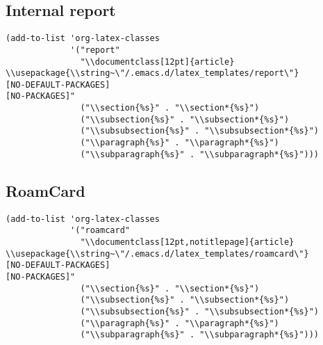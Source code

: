 \documentclass[12pt]{article}
\begin{document}
\subsection{Internal report}
\label{sec:org9e49dab}
\begin{verbatim}
(add-to-list 'org-latex-classes
             '("report"
               "\\documentclass[12pt]{article}
\\usepackage{\\string~\"/.emacs.d/latex_templates/report\"}
[NO-DEFAULT-PACKAGES]
[NO-PACKAGES]"
               ("\\section{%s}" . "\\section*{%s}")
               ("\\subsection{%s}" . "\\subsection*{%s}")
               ("\\subsubsection{%s}" . "\\subsubsection*{%s}")
               ("\\paragraph{%s}" . "\\paragraph*{%s}")
               ("\\subparagraph{%s}" . "\\subparagraph*{%s}")))
\end{verbatim}
\subsection{RoamCard}
\label{sec:org49dca5b}
\begin{verbatim}
(add-to-list 'org-latex-classes
             '("roamcard"
               "\\documentclass[12pt,notitlepage]{article}
\\usepackage{\\string~\"/.emacs.d/latex_templates/roamcard\"}
[NO-DEFAULT-PACKAGES]
[NO-PACKAGES]"
               ("\\section{%s}" . "\\section*{%s}")
               ("\\subsection{%s}" . "\\subsection*{%s}")
               ("\\subsubsection{%s}" . "\\subsubsection*{%s}")
               ("\\paragraph{%s}" . "\\paragraph*{%s}")
               ("\\subparagraph{%s}" . "\\subparagraph*{%s}")))
\end{verbatim}
\end{document}
